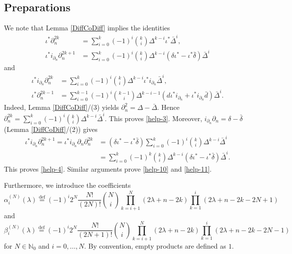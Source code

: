 \documentclass[a4paper,12pt,reqno]{amsart}
\numberwithin{theorem}{subsection}
\numberwithin{equation}{section}
\begin{document}
\subsection{Preparations}

We note that Lemma \ref{DiffCoDiff} implies the identities
\begin{align}
   \iota^*\partial_n^{2k} & = \sum_{i=0}^k (-1)^i \binom{k}{i}
   \Delta^{k-i}\iota^* \bar{\Delta}^i, \label{help-3} \\
   \iota^* i_{\partial_n} \partial_n^{2k+1} & = \sum_{i=0}^k (-1)^i
   \binom{k}{i} \Delta^{k-i}(\delta\iota^*-\iota^*\bar{\delta}) \bar{\Delta}^i \label{help-4}
\end{align}
and
\begin{align}
   \iota^*i_{\partial_n} \partial_n^{2k} & =
   \sum_{i=0}^{k}(-1)^i \binom{k}{i}\Delta^{k-i}\iota^* i_{\partial_n} \bar{\Delta}^i, \label{help-10} \\
   \iota^*\partial_n^{2k-1} & =
   \sum_{i=0}^{k-1}(-1)^i \binom{k-1}{i} \Delta^{k-i-1} ({d}\iota^* i_{\partial_n}
   + \iota^* i_{\partial_n} \bar{d}) \bar{\Delta}^i. \label{help-11}
\end{align}
Indeed, Lemma \ref{DiffCoDiff}/(3) yields $\partial_n^2 = \Delta -
\bar{\Delta}$. Hence $\partial_n^{2k} = \sum_{i=0}^k (-1)^i {k \choose i}
\Delta^{k-i} \bar{\Delta}^i$. This proves \eqref{help-3}. Moreover,
$i_{\partial_n} \partial_n = \delta - \bar{\delta}$ (Lemma
\ref{DiffCoDiff}/(2)) gives
\begin{align*}
   \iota^* i_{\partial_n} \partial_n^{2k+1} = \iota^* i_{\partial_n} \partial_n
   \partial_n^{2k} & = (\delta \iota^* - \iota^* \bar{\delta})
   \sum_{i=0}^k (-1)^i {k \choose i} \Delta^{k-i} \bar{\Delta}^i \\
   & = \sum_{i=0}^k (-1)^k {k \choose i} \Delta^{k-i} (\delta \iota^* - \iota^* \bar{\delta}) \bar{\Delta}^i.
\end{align*}
This proves \eqref{help-4}. Similar arguments prove \eqref{help-10} and
\eqref{help-11}.

Furthermore, we introduce the coefficients
\begin{equation}\label{a-even}
   \alpha_i^{(N)}(\lambda) {\stackrel{\text{def}}{=}} (-1)^{i} 2^N \frac{N!}{(2N)!} \binom{N}{i}
   \prod_{k=i+1}^N (2\lambda\!+\!n\!-\!2k) \prod_{k=1}^i (2\lambda\!+\!n\!-\!2k\!-\!2N\!+\!1)
\end{equation}
and
\begin{equation}\label{b-even}
   \beta_i^{(N)}(\lambda) {\stackrel{\text{def}}{=}} (-1)^i 2^N \frac{N!}{(2N\!+\!1)!} \binom{N}{i}
   \prod_{k=i+1}^N (2\lambda\!+\!n\!-\!2k) \prod_{k=1}^i (2\lambda\!+\!n\!-\!2k\!-\!2N\!-\!1)
\end{equation}
for $N \in {\mathbb{N}}_0$ and $i=0,\dots,N$. By convention, empty products are defined
as $1$.
\end{document}
